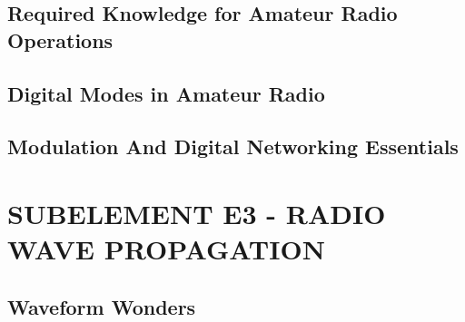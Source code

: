 \documentclass[12pt]{book}
\begin{document}
\section{Required Knowledge for Amateur Radio Operations}












\section{Digital Modes in Amateur Radio}











\section{Modulation And Digital Networking Essentials}













\chapter{SUBELEMENT E3 - RADIO WAVE PROPAGATION}
\section{Waveform Wonders}














\end{document}
